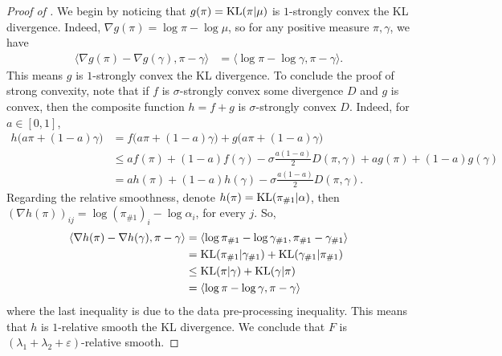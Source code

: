 \begin{proof}[Proof of ]
We begin by noticing that $g(\pi) = \text{KL}(\pi | \mu)$ is $1$-strongly convex \wrt the KL divergence.
Indeed, $\nabla g(\pi) = \log \pi - \log \mu$, so for any positive measure $\pi, \gamma$, we have
\begin{align*}
    \langle \nabla g(\pi) - \nabla g(\gamma), \pi - \gamma \rangle
    &= \langle
    \log \pi - \log \gamma, \pi - \gamma \rangle.
\end{align*}
This means $g$ is $1$-strongly convex \wrt the KL divergence.
To conclude the proof of strong convexity, note that if $f$ is $\sigma$-strongly convex \wrt
some divergence $D$ and $g$ is convex, then the composite function $h = f + g$ is
$\sigma$-strongly convex \wrt $D$. Indeed, for $a \in [0,1]$,
\begin{align*}
    h \big( a \pi + (1-a) \gamma \big)
    &= f \big( a \pi + (1-a) \gamma \big) + g \big( a \pi + (1-a) \gamma \big) \\
    &\leq a f(\pi) + (1 - a) f(\gamma) - \sigma \frac{a (1 - a)}{2} D(\pi, \gamma)
    + a g(\pi) + (1 - a) g(\gamma) \\
    &= a h(\pi) + (1 - a) h(\gamma) - \sigma \frac{a (1 - a)}{2} D(\pi, \gamma).
\end{align*}
Regarding the relative smoothness, denote $h(\pi) = \text{KL}(\pi_{\#1} | \alpha)$,
then $(\nabla h(\pi))_{ij} = \log (\pi_{\#1})_i - \log \alpha_i$, for every $j$. So,
\begin{equation*}
    \begin{split}
        \langle \nabla h(\pi) - \nabla h(\gamma), \pi - \gamma \rangle
    &= \langle
    \log \pi_{\# 1} - \log \gamma_{\# 1}, \pi_{\# 1} - \gamma_{\# 1} \rangle\\
    &= \text{KL}(\pi_{\# 1} | \gamma_{\# 1}) + \text{KL}(\gamma_{\# 1} | \pi_{\# 1}) \\
    &\leq \text{KL}(\pi | \gamma) + \text{KL}(\gamma | \pi) \\
    &= \langle \log \pi - \log \gamma, \pi - \gamma \rangle
    \end{split}
\end{equation*}
where the last inequality is due to the data pre-processing inequality.
This means that $h$ is $1$-relative smooth \wrt the KL divergence.
We conclude that $F$ is $(\lambda_1 + \lambda_2 + \varepsilon)$-relative smooth.
\end{proof}

